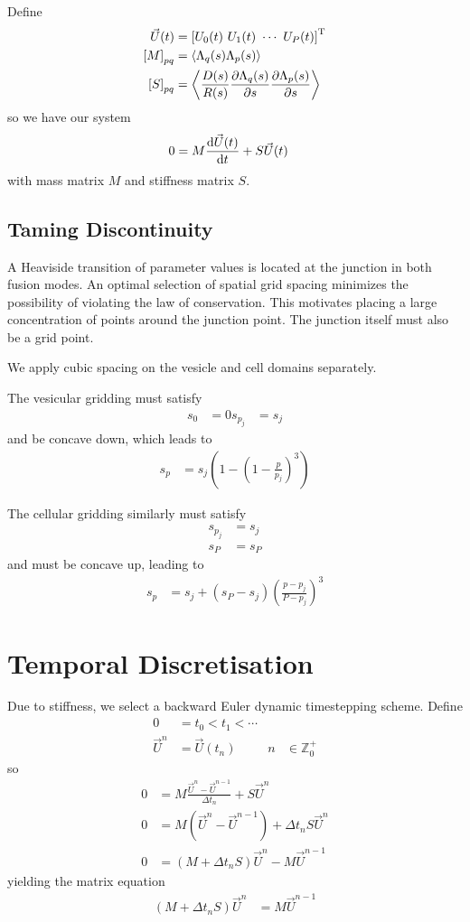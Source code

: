 \documentclass{report}
\newcommand\Par[1]{{ \left({#1}\right) }}
\newcommand\Brack[1]{{ \left[{#1}\right] }}
\newcommand\Angle[1]{{ \left\langle{#1}\right\rangle }}
\newcommand\bbZ{{ \mathbb{Z} }}
\begin{document}
Define
\begin{align*}
	\Vec{U}(t) &= \Brack{U_0(t)\ U_1(t)\ \cdots\ U_P(t)}^\text{T} \\
	\Brack{M}_{pq} &= \Angle{\Lambda_q(s) \Lambda_p(s)} \\
	\Brack{S}_{pq} &= \Angle{\frac{D(s)}{R(s)} \pdv{\Lambda_q(s)}{s} \pdv{\Lambda_p(s)}{s}}
\end{align*}
so we have our system
\begin{align*}
	0 &= M \dv{\vec{U}(t)}{t} + S \vec{U}(t)
\end{align*}
with mass matrix $M$ and stiffness matrix $S$.

\subsection{Taming Discontinuity}
A Heaviside transition of parameter values is located at the junction in both fusion modes. An optimal selection of spatial grid spacing minimizes the possibility of violating the law of conservation. This motivates placing a large concentration of points around the junction point. The junction itself must also be a grid point.

We apply cubic spacing on the vesicle and cell domains separately.

The vesicular gridding must satisfy
\begin{align*}
	s_0 &= 0
	s_{p_j} &= s_j
\end{align*}
and be concave down, which leads to
\begin{align*}
	s_p &= s_j \Par{1 - \Par{1 - \frac{p}{p_j}}^3}
\end{align*}

The cellular gridding similarly must satisfy
\begin{align*}
	s_{p_j} &= s_j \\
	s_P &= s_P
\end{align*}
and must be concave up, leading to
\begin{align*}
	s_p &= s_j + \Par{s_P - s_j} \Par{\frac{p - p_j}{P - p_j}}^3
\end{align*}

\section{Temporal Discretisation}
Due to stiffness, we select a backward Euler dynamic timestepping scheme. Define
\begin{align*}
	0 &= t_0 < t_1 < \cdots \\
	\vec{U}^n &= \vec{U}(t_n) & n &\in \bbZ_0^+
\end{align*}
so
\begin{align*}
	0 &= M \frac{\vec{U}^n - \vec{U}^{n - 1}}{\Delta{t}_n} + S \vec{U}^n \\
	0 &= M \Par{\vec{U}^n - \vec{U}^{n - 1}} + \Delta{t}_n S \vec{U}^n \\
	0 &= \Par{M + \Delta{t}_n S} \vec{U}^n - M \vec{U}^{n-1}
\end{align*}
yielding the matrix equation
\begin{align*}
	\Par{M + \Delta{t}_n S} \vec{U}^n &= M \vec{U}^{n-1}
\end{align*}
\end{document}
